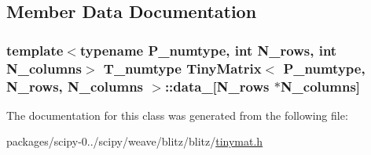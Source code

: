 \subsection{Member Data Documentation}
\hypertarget{classTinyMatrix_a795148157a5e7a094df5b8177717bee3}{}
\subsubsection[{data\+\_\+}]{\setlength{\rightskip}{0pt plus 5cm}template$<$typename P\+\_\+numtype, int N\+\_\+rows, int N\+\_\+columns$>$ {\bf T\+\_\+numtype} {\bf Tiny\+Matrix}$<$ P\+\_\+numtype, N\+\_\+rows, N\+\_\+columns $>$\+::data\+\_\+\mbox{[}N\+\_\+rows $\ast$N\+\_\+columns\mbox{]}\hspace{0.3cm}{\ttfamily [protected]}}\label{classTinyMatrix_a795148157a5e7a094df5b8177717bee3}


The documentation for this class was generated from the following file\+:\begin{DoxyCompactItemize}
\item 
packages/scipy-\/0../scipy/weave/blitz/blitz/\hyperlink{tinymat_8h}{tinymat.\+h}\end{DoxyCompactItemize}
